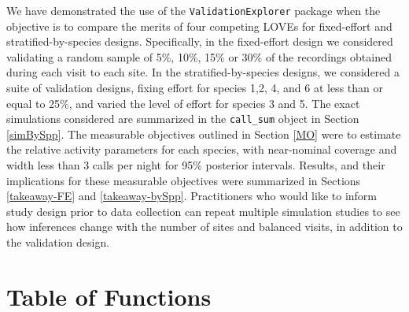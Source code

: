 \documentclass[
]{article}
\begin{document}
We have demonstrated the use of the \texttt{ValidationExplorer} package when the objective is to compare the merits of four competing LOVEs for fixed-effort and stratified-by-species designs. Specifically, in the fixed-effort design we considered validating a random sample of 5\%, 10\%, 15\% or 30\% of the recordings obtained during each visit to each site. In the stratified-by-species designs, we considered a suite of validation designs, fixing effort for species 1,2, 4, and 6 at less than or equal to 25\%, and varied the level of effort for species 3 and 5. The exact simulations considered are summarized in the \texttt{call\_sum} object in Section \ref{simBySpp}. The measurable objectives outlined in Section \ref{MO} were to estimate the relative activity parameters for each species, with near-nominal coverage and width less than 3 calls per night for 95\% posterior intervals. Results, and their implications for these measurable objectives were summarized in Sections \ref{takeaway-FE} and \ref{takeaway-bySpp}. Practitioners who would like to inform study design prior to data collection can repeat multiple simulation studies to see how inferences change with the number of sites and balanced visits, in addition to the validation design.

\newpage

\section{\texorpdfstring{Table of Functions \label{BigTable}}{Table of Functions }}\label{table-of-functions}
\end{document}
